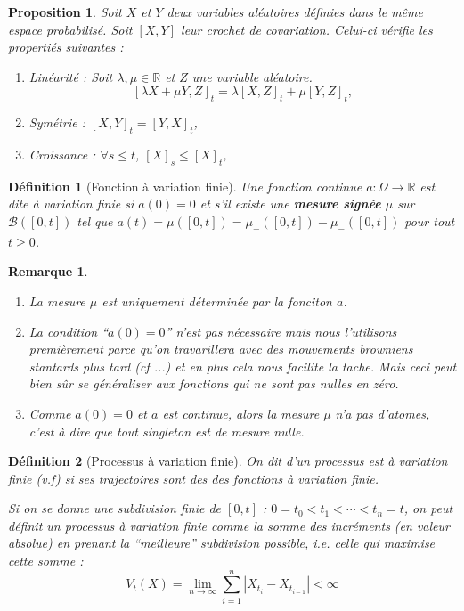 \documentclass[openany]{book}
\newcommand{\R}{\mathbb{R}}
\theoremstyle{thmfont}
\theoremstyle{deffont}
\newtheorem{definition}[definition]{Définition}
\theoremstyle{thmfont}
\newtheorem{prop}[prop]{Proposition}
\theoremstyle{deffont}
\newtheorem*{remark}{Remarque}
\begin{document}
\begin{prop} Soit $X$ et $Y$ deux variables aléatoires définies dans le même espace probabilisé. Soit $[X,Y]$ leur crochet de covariation. Celui-ci vérifie les propertiés suivantes : 
  \begin{enumerate}
  \item Linéarité : Soit $\lambda, \mu \in \R$ et $Z$ une variable aléatoire. $$[\lambda X + \mu Y, Z]_t = \lambda[X,Z]_t + \mu[Y,Z]_t,$$
  \item Symétrie : $[X,Y]_t = [Y,X]_t$,
  \item Croissance : $\forall s\leq t$, $[X]_s \leq [X]_t$,
  \end{enumerate}
\end{prop}

\begin{definition}[Fonction à variation finie] Une fonction continue $a : \Omega \rightarrow \R$ est dite \textit{à variation finie} si $a(0) = 0$ et s'il existe une \textbf{mesure signée} $\mu$ sur $\mathcal B([0,t])$ tel que $a(t) = \mu([0,t]) = \mu_+([0,t]) - \mu_-([0,t])$ pour tout $t \geq 0$.
\label{def:fct_var_finie}
\end{definition}

\begin{remark}
  \begin{enumerate}
  \item La mesure $\mu$ est uniquement déterminée par la fonciton $a$.
  \item La condition ``$a(0)=0$'' n'est pas nécessaire mais nous l'utilisons premièrement parce qu'on travarillera avec des mouvements browniens stantards plus tard {\color{red}(cf ...)} et en plus cela nous facilite la tache. Mais ceci peut bien sûr se généraliser aux fonctions qui ne sont pas nulles en zéro.
  \item Comme $a(0) = 0$ et $a$ est continue, alors la mesure $\mu$ n'a pas d'\textit{atomes}, c'est à dire que tout singleton est de mesure nulle.
  \end{enumerate}
\end{remark}

\begin{definition}[Processus à variation finie]
  On dit d'un processus est \textit{à variation finie} (v.f) si ses trajectoires sont des des fonctions à variation finie.

  Si on se donne une subdivision finie de $[0,t]$ :  $0 = t_0 < t_1 < \cdots < t_n = t$, on peut définit un processus à variation finie comme la somme des incréments (en valeur absolue) en prenant la ``meilleure'' subdivision possible, i.e. celle qui maximise cette somme :
  $$ V_t(X) = \lim_{n \to \infty} \sum_{i=1}^n |X_{t_i} - X_{t_{i-1}}| < \infty$$
\end{definition}
\end{document}
